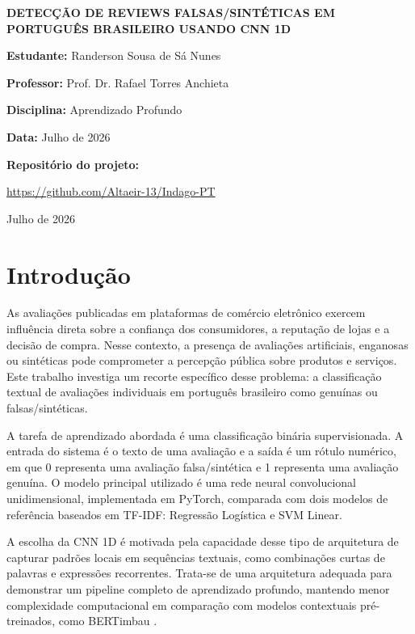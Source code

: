 \documentclass[12pt,a4paper]{article}
\begin{document}
\begin{titlepage}
\begin{center}
{\Large\bfseries DETECÇÃO DE REVIEWS FALSAS/SINTÉTICAS EM PORTUGUÊS BRASILEIRO USANDO CNN 1D\par}

\vfill

\begin{minipage}{0.92\textwidth}
\centering
\textbf{Estudante:} Randerson Sousa de Sá Nunes\par
\textbf{Professor:} Prof. Dr. Rafael Torres Anchieta\par
\textbf{Disciplina:} Aprendizado Profundo\par
\textbf{Data:} Julho de 2026\par
\vspace{0.6cm}
\textbf{Repositório do projeto:}\par
\url{https://github.com/Altaeir-13/Indago-PT}
\end{minipage}

\vfill

Julho de 2026
\end{center}
\end{titlepage}


\section{Introdução}

As avaliações publicadas em plataformas de comércio eletrônico exercem influência direta sobre a confiança dos consumidores, a reputação de lojas e a decisão de compra. Nesse contexto, a presença de avaliações artificiais, enganosas ou sintéticas pode comprometer a percepção pública sobre produtos e serviços. Este trabalho investiga um recorte específico desse problema: a classificação textual de avaliações individuais em português brasileiro como genuínas ou falsas/sintéticas.

A tarefa de aprendizado abordada é uma classificação binária supervisionada. A entrada do sistema é o texto de uma avaliação e a saída é um rótulo numérico, em que 0 representa uma avaliação falsa/sintética e 1 representa uma avaliação genuína. O modelo principal utilizado é uma rede neural convolucional unidimensional, implementada em PyTorch, comparada com dois modelos de referência baseados em TF-IDF: Regressão Logística e SVM Linear.

A escolha da CNN 1D é motivada pela capacidade desse tipo de arquitetura de capturar padrões locais em sequências textuais, como combinações curtas de palavras e expressões recorrentes. Trata-se de uma arquitetura adequada para demonstrar um pipeline completo de aprendizado profundo, mantendo menor complexidade computacional em comparação com modelos contextuais pré-treinados, como BERTimbau \cite{souza2020bertimbau}.
\end{document}
